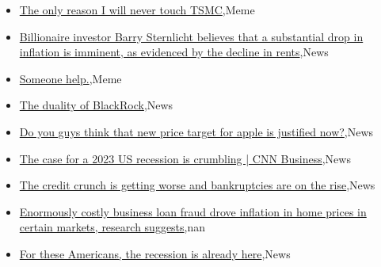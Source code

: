 \documentclass{article}%
\begin{document}
%
\begin{itemize}%
\item%
\href{https://reddit.com/r/wallstreetbets/comments/14qbv81/the\_only\_reason\_i\_will\_never\_touch\_tsmc/}{The only reason I will never touch TSMC},Meme%
\item%
\href{https://reddit.com/r/wallstreetbets/comments/14qb0p3/billionaire\_investor\_barry\_sternlicht\_believes/}{Billionaire investor Barry Sternlicht believes that a substantial drop in inflation is imminent, as evidenced by the decline in rents},News%
\item%
\href{https://reddit.com/r/wallstreetbets/comments/14q6dmw/someone\_help/}{Someone help.},Meme%
\item%
\href{https://reddit.com/r/StockMarket/comments/14q5q1l/the\_duality\_of\_blackrock/}{The duality of BlackRock},News%
\item%
\href{https://reddit.com/r/StockMarket/comments/14q11br/do\_you\_guys\_think\_that\_new\_price\_target\_for\_apple/}{Do you guys think that new price target for apple is justified now?},News%
\item%
\href{https://reddit.com/r/StockMarket/comments/14pyvcv/the\_case\_for\_a\_2023\_us\_recession\_is\_crumbling\_cnn/}{The case for a 2023 US recession is crumbling | CNN Business},News%
\item%
\href{https://reddit.com/r/Economics/comments/14q0aws/the\_credit\_crunch\_is\_getting\_worse\_and/}{The credit crunch is getting worse and bankruptcies are on the rise},News%
\item%
\href{https://reddit.com/r/Economics/comments/14pmhb4/enormously\_costly\_business\_loan\_fraud\_drove/}{Enormously costly business loan fraud drove inflation in home prices in certain markets, research suggests},nan%
\item%
\href{https://reddit.com/r/Economics/comments/14pma8x/for\_these\_americans\_the\_recession\_is\_already\_here/}{For these Americans, the recession is already here},News%
\end{itemize}%
\end{document}
